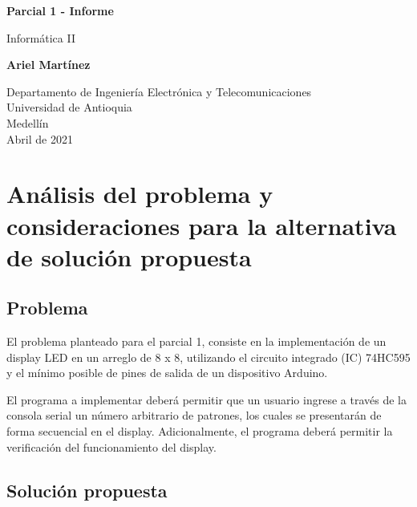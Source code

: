 \documentclass{article}
\begin{document}
\begin{titlepage}
    \begin{center}
        \vspace*{1cm}
            
        \Huge
        \textbf{Parcial 1 - Informe}
            
        \vspace{0.5cm}
        \LARGE
        Informática II
            
        \vspace{1.5cm}
            
        \textbf{Ariel Martínez}
            
        \vfill
            
        \vspace{0.8cm}
            
        \Large
        Departamento de Ingeniería Electrónica y Telecomunicaciones\\
        Universidad de Antioquia\\
        Medellín\\
        Abril de 2021
            
    \end{center}
\end{titlepage}

\tableofcontents
\newpage
\section{Análisis del problema y consideraciones para la alternativa de solución propuesta}\label{analisis}

\subsection{Problema}

El problema planteado para el parcial 1, consiste en la implementación de un display LED en un arreglo de 8 x 8, utilizando el circuito integrado (IC) 74HC595 y el mínimo posible de pines de salida de un dispositivo Arduino.

El programa a implementar deberá permitir que un usuario ingrese a través de la consola serial un número arbitrario de patrones, los cuales se presentarán de forma secuencial en el display. Adicionalmente, el programa deberá permitir la verificación del funcionamiento del display.

\subsection{Solución propuesta}
\end{document}
